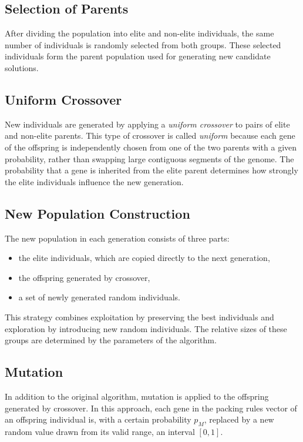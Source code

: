 \subsection{Selection of Parents}

After dividing the population into elite and non-elite individuals, the same number of individuals is randomly selected from both groups. 
These selected individuals form the parent population used for generating new candidate solutions.

\subsection{Uniform Crossover}

New individuals are generated by applying a \emph{uniform crossover} to pairs of elite and non-elite parents. 
This type of crossover is called \emph{uniform} because each gene of the offspring is independently chosen from one of the two parents with a given probability, rather than swapping large contiguous segments of the genome. 
The probability that a gene is inherited from the elite parent determines how strongly the elite individuals influence the new generation.

\subsection{New Population Construction}

The new population in each generation consists of three parts:

\begin{itemize}
    \item the elite individuals, which are copied directly to the next generation,
    \item the offspring generated by crossover,
    \item a set of newly generated random individuals.
\end{itemize}

This strategy combines exploitation by preserving the best individuals and exploration by introducing new random individuals.
The relative sizes of these groups are determined by the parameters of the algorithm.

\subsection{Mutation}

In addition to the original algorithm, mutation is applied to the offspring generated by crossover. 
In this approach, each gene in the packing rules vector of an offspring individual is, with a certain probability $p_M$, replaced by a new random value drawn from its valid range, an interval $[0,1]$. 

